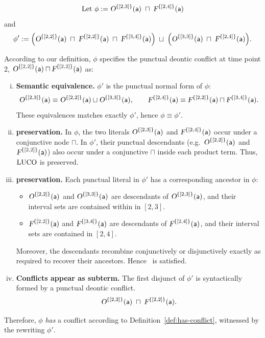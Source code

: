 \begin{example}
\[\text{Let }
  \phi := \textsl{O}^{\{[2,3]\}}(\mathsf{a}) \;\sqcap\; \textsl{F}^{\{[2,4]\}}(\mathsf{a})
\]
and
\[
  \phi' := 
  \Big(\textsl{O}^{\{[2,2]\}}(\mathsf{a}) \;\sqcap\; \textsl{F}^{\{[2,2]\}}(\mathsf{a}) \;\sqcap\; \textsl{F}^{\{[3,4]\}}(\mathsf{a})\Big)
  \;\sqcup\;
  \Big(\textsl{O}^{\{[3,3]\}}(\mathsf{a}) \;\sqcap\; \textsl{F}^{\{[2,4]\}}(\mathsf{a})\Big).
\]

\noindent
 According to our definition, $\phi$ specifies the punctual deontic conflict at time point 2, $\textsl{O}^{\{[2,2]\}}(\mathsf{a}) \sqcap \textsl{F}^{\{[2,2]\}}(\mathsf{a})$ as:
\begin{enumerate}[(i)]
  \item \textbf{Semantic equivalence.}  
  $\phi'$ is the punctual normal form of $\phi$:
  \[
    \textsl{O}^{\{[2,3]\}}(\mathsf{a}) \equiv \textsl{O}^{\{[2,2]\}}(\mathsf{a}) \sqcup \textsl{O}^{\{[3,3]\}}(\mathsf{a}), \qquad
    \textsl{F}^{\{[2,4]\}}(\mathsf{a}) \equiv \textsl{F}^{\{[2,2]\}}(\mathsf{a}) \sqcap \textsl{F}^{\{[3,4]\}}(\mathsf{a}).
  \]
  These equivalences matches exactly $\phi'$, hence $\phi \equiv \phi'$.

  \item \textbf{\LUCO preservation.}  
  In $\phi$, the two literals $\textsl{O}^{\{[2,3]\}}(\mathsf{a})$ and $\textsl{F}^{\{[2,4]\}}(\mathsf{a})$ occur under a conjunctive node $\sqcap$.  
  In $\phi'$, their punctual descendants (e.g.\ $\textsl{O}^{\{[2,2]\}}(\mathsf{a})$ and $\textsl{F}^{\{[2,2]\}}(\mathsf{a})$) also occur under a conjunctive $\sqcap$ inside each product term. Thus, $\mathrm{LUCO}$ is preserved.

  \item \textbf{\LAP preservation.}  
  Each punctual literal in $\phi'$ has a corresponding ancestor in $\phi$:
  \begin{itemize}
    \item $\textsl{O}^{\{[2,2]\}}(\mathsf{a})$ and $\textsl{O}^{\{[3,3]\}}(\mathsf{a})$ are descendants of $\textsl{O}^{\{[2,3]\}}(\mathsf{a})$, and their interval sets are contained within in $[2,3]$.
    \item $\textsl{F}^{\{[2,2]\}}(\mathsf{a})$ and $\textsl{F}^{\{[3,4]\}}(\mathsf{a})$ are descendants of $\textsl{F}^{\{[2,4]\}}(\mathsf{a})$, and their interval sets are contained in $[2,4]$.
  \end{itemize}
  Moreover, the descendants recombine conjunctively or disjunctively exactly as required to recover their ancestors. Hence \LAP\ is satisfied.

  \item \textbf{Conflicts appear as subterm.}  
  The first disjunct of $\phi'$ is syntactically formed by a punctual deontic conflict.
  \[
    \textsl{O}^{\{[2,2]\}}(\mathsf{a}) \;\sqcap\; \textsl{F}^{\{[2,2]\}}(\mathsf{a}).
  \]
\end{enumerate}

\noindent
Therefore, $\phi$ \emph{has} a conflict according to Definition~\ref{def:has-conflict}, witnessed by the rewriting $\phi'$.
\end{example}

